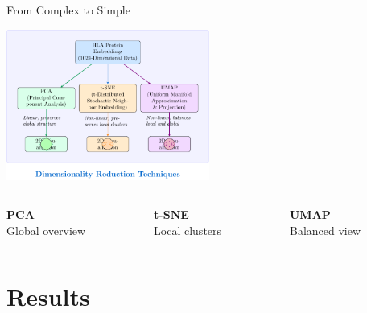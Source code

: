 \documentclass[aspectratio=169]{beamer}
\begin{document}
\begin{frame}{From Complex to Simple}
  \begin{center}
    \includegraphics[width=0.5\textwidth]{dim_reduction_diagram.pdf}
  \end{center}

  \begin{columns}
    \begin{column}{0.33\textwidth}\centering\small
      \textbf{PCA}\\
      Global overview
    \end{column}
    \begin{column}{0.33\textwidth}\centering\small
      \textbf{t-SNE}\\
      Local clusters
    \end{column}
    \begin{column}{0.33\textwidth}\centering\small
      \textbf{UMAP}\\
      Balanced view
    \end{column}
  \end{columns}
\end{frame}

\section{Results}
\end{document}
